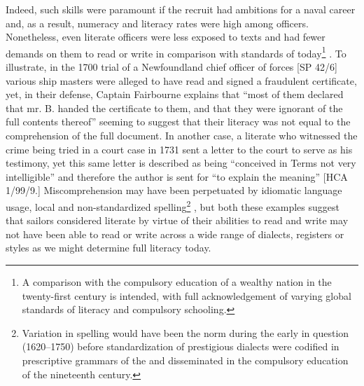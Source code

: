 Indeed, such skills were paramount if the recruit had ambitions for a naval career and, as a result, numeracy and literacy rates were high among officers. Nonetheless, even literate officers were less exposed to texts and had fewer demands on them to read or write in comparison with standards of today\footnote{A comparison with the compulsory education of a wealthy nation in the twenty-first century is intended, with full acknowledgement of varying global standards of literacy and compulsory schooling.} . To illustrate, in the 1700 trial of a Newfoundland chief officer of forces [SP 42/6] various ship masters were alleged to have read and signed a fraudulent certificate, yet, in their defense, Captain Fairbourne explains that “most of them declared that mr. B. handed the certificate to them, and that they were ignorant of the full contents thereof” seeming to suggest that their literacy was not equal to the comprehension of the full document. In another case, a literate  who witnessed the crime being tried in a court case in 1731 sent a letter to the court to serve as his testimony, yet this same letter is described as being “conceived in Terms not very intelligible” and therefore the author is sent for “to explain the meaning” [HCA 1/99/9.] Miscomprehension may have been perpetuated by idiomatic language usage, local  and non-standardized spelling\footnote{Variation in spelling would have been the norm during the early  in question (1620--1750) before standardization of prestigious dialects were codified in prescriptive grammars of the  and disseminated in the compulsory education of the nineteenth century.} , but both these examples suggest that sailors considered literate by virtue of their abilities to read and write may not have been able to read or write across a wide range of dialects, registers or styles as we might determine full literacy today.  

